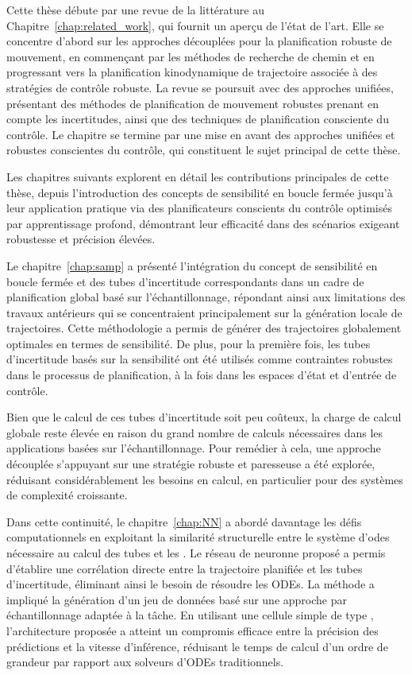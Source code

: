 Cette thèse débute par une revue de la littérature au Chapitre~\ref{chap:related_work}, qui fournit un aperçu de l’état de l’art. 
Elle se concentre d’abord sur les approches découplées pour la planification robuste de mouvement, en commençant par les méthodes de recherche de chemin et en progressant vers la planification kinodynamique de trajectoire associée à des stratégies de contrôle robuste. 
La revue se poursuit avec des approches unifiées, présentant des méthodes de planification de mouvement robustes prenant en compte les incertitudes, ainsi que des techniques de planification consciente du contrôle. 
Le chapitre se termine par une mise en avant des approches unifiées et robustes conscientes du contrôle, qui constituent le sujet principal de cette thèse.

Les chapitres suivants explorent en détail les contributions principales de cette thèse, depuis l’introduction des concepts de sensibilité en boucle fermée jusqu’à leur application pratique via des planificateurs conscients du contrôle optimisés par apprentissage profond, démontrant leur efficacité dans des scénarios exigeant robustesse et précision élevées.

Le chapitre~\ref{chap:samp} a présenté l'intégration du concept de sensibilité en boucle fermée et des tubes d'incertitude correspondants dans un cadre de planification global basé sur l'échantillonnage, répondant ainsi aux limitations des travaux antérieurs qui se concentraient principalement sur la génération locale de trajectoires. 
Cette méthodologie a permis de générer des trajectoires globalement optimales en termes de sensibilité. 
De plus, pour la première fois, les tubes d'incertitude basés sur la sensibilité ont été utilisés comme contraintes robustes dans le processus de planification, à la fois dans les espaces d'état et d'entrée de contrôle.

Bien que le calcul de ces tubes d'incertitude soit peu coûteux, la charge de calcul globale reste élevée en raison du grand nombre de calculs nécessaires dans les applications basées sur l'échantillonnage. 
Pour remédier à cela, une approche découplée s'appuyant sur une stratégie robuste et paresseuse a été explorée, réduisant considérablement les besoins en calcul, en particulier pour des systèmes de complexité croissante.

Dans cette continuité, le chapitre~\ref{chap:NN} a abordé davantage les défis computationnels en exploitant la similarité structurelle entre le système d'\gls{odes} nécessaire au calcul des tubes et les . 
Le réseau de neuronne proposé a permis d'établire une corrélation directe entre la trajectoire planifiée et les tubes d'incertitude, éliminant ainsi le besoin de résoudre les ODEs. 
La méthode a impliqué la génération d'un jeu de données basé sur une approche par échantillonnage adaptée à la tâche. 
En utilisant une cellule simple de type , l'architecture proposée a atteint un compromis efficace entre la précision des prédictions et la vitesse d'inférence, réduisant le temps de calcul d'un ordre de grandeur par rapport aux solveurs d'ODEs traditionnels.

